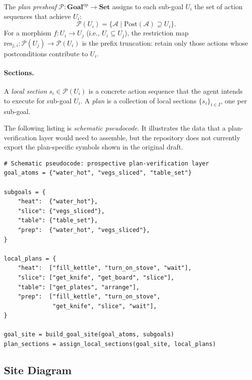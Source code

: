 \documentclass[11pt]{article}
\newcommand{\PlanSheaf}{\mathcal{P}}
\newcommand{\SubGoal}[1]{U_{#1}}
\newcommand{\ActionSeq}{\mathcal{A}}
\newcommand{\PostCond}{\mathrm{Post}}
\newcommand{\PlanRes}{\mathrm{res}}
\newcommand{\GoalCat}{\mathbf{Goal}}
\newcommand{\SetCat}{\mathbf{Set}}
\begin{document}
\begin{definition}\label{def:plan-presheaf}
  The \emph{plan presheaf} $\PlanSheaf : \GoalCat^{\mathrm{op}} \to \SetCat$
  assigns to each sub-goal $\SubGoal{i}$ the set of action sequences
  that achieve $\SubGoal{i}$:
  \[
    \PlanSheaf(\SubGoal{i}) = \{ \ActionSeq \mid
      \PostCond(\ActionSeq) \supseteq \SubGoal{i} \}.
  \]
  For a morphism $f : \SubGoal{i} \to \SubGoal{j}$
  (i.e., $\SubGoal{i} \subseteq \SubGoal{j}$), the restriction
  map $\PlanRes_{j,i} : \PlanSheaf(\SubGoal{j}) \to \PlanSheaf(\SubGoal{i})$
  is the prefix truncation: retain only those actions whose
  postconditions contribute to $\SubGoal{i}$.
\end{definition}

\paragraph{Sections.}
A \emph{local section} $s_i \in \PlanSheaf(\SubGoal{i})$ is
a concrete action sequence that the agent intends to execute
for sub-goal $\SubGoal{i}$.  A \emph{plan} is a collection
of local sections $\{s_i\}_{i \in I}$, one per sub-goal.

The following listing is \emph{schematic pseudocode}.  It illustrates
the data that a plan-verification layer would need to assemble, but the
repository does not currently export the plan-specific symbols shown in
the original draft.

\begin{lstlisting}
# Schematic pseudocode: prospective plan-verification layer
goal_atoms = {"water_hot", "vegs_sliced", "table_set"}

subgoals = {
    "heat":  {"water_hot"},
    "slice": {"vegs_sliced"},
    "table": {"table_set"},
    "prep":  {"water_hot", "vegs_sliced"},
}

local_plans = {
    "heat":  ["fill_kettle", "turn_on_stove", "wait"],
    "slice": ["get_knife", "get_board", "slice"],
    "table": ["get_plates", "arrange"],
    "prep":  ["fill_kettle", "turn_on_stove",
              "get_knife", "slice", "wait"],
}

goal_site = build_goal_site(goal_atoms, subgoals)
plan_sections = assign_local_sections(goal_site, local_plans)
\end{lstlisting}

\subsection{Site Diagram}\label{ssec:site-diagram}
\end{document}
